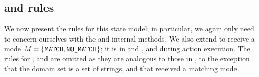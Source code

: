 \begin{mathpar}
\end{mathpar}

\subsection{ and  rules}

We now present the rules for this state model; in particular, we again only need to concern ourselves with the  and  internal methods. We also extend  to receive a mode ${M= \{\code{MATCH},\code{NO\_MATCH}\}}$; it is  in \consume{} and \produce, and  during action execution. The rules for \execac, \consume{} and \produce{} are omitted as they are analogous to those in \PMap, to the exception that the domain set is a set of strings, and that  received a matching mode.

